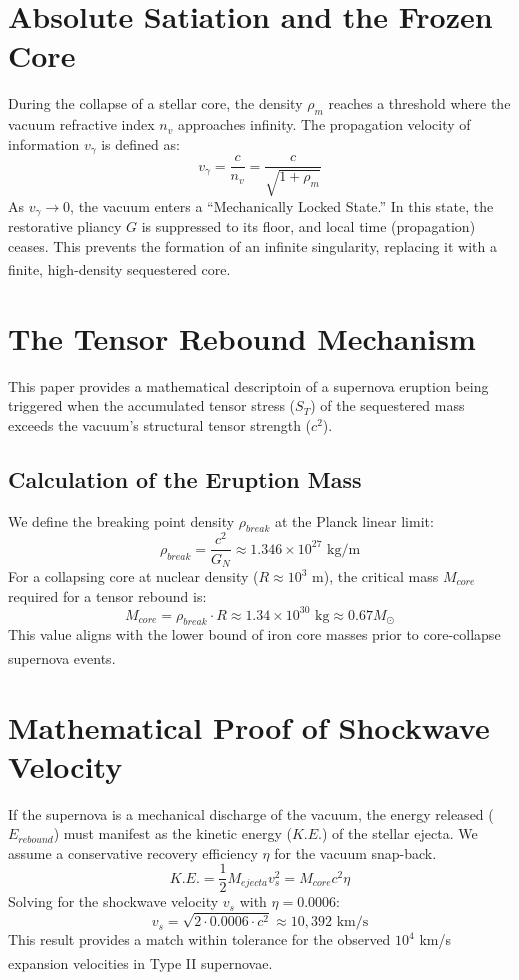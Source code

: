 \documentclass[11pt,a4paper,oneside]{article}
\newcommand{\citeS}[1]{\textsuperscript{\cite{#1}}}
\begin{document}
\section{Absolute Satiation and the Frozen Core}
During the collapse of a stellar core, the density $\rho_m$ reaches a threshold where the vacuum refractive index $n_v$ approaches infinity. The propagation velocity of information $v_{\gamma}$ is defined as:
\begin{equation}
v_{\gamma} = \frac{c}{n_v} = \frac{c}{\sqrt{1 + \rho_m}}
\end{equation}
As $v_{\gamma} \to 0$, the vacuum enters a ``Mechanically Locked State.'' In this state, the restorative pliancy $G$ is suppressed to its floor, and local time (propagation) ceases. This prevents the formation of an infinite singularity, replacing it with a finite, high-density sequestered core\citeS{Penrose1965}.

\section{The Tensor Rebound Mechanism}
This paper provides a mathematical descriptoin of a supernova eruption being triggered when the accumulated tensor stress ($S_T$) of the sequestered mass exceeds the vacuum's structural tensor strength ($c^2$).

\subsection{Calculation of the Eruption Mass}
We define the breaking point density $\rho_{break}$ at the Planck linear limit:
\begin{equation}
\rho_{break} = \frac{c^2}{G_N} \approx 1.346 \times 10^{27} \text{ kg/m}
\end{equation}
For a collapsing core at nuclear density ($R \approx 10^3$ m), the critical mass $M_{core}$ required for a tensor rebound is:
\begin{equation}
M_{core} = \rho_{break} \cdot R \approx 1.34 \times 10^{30} \text{ kg} \approx 0.67 M_{\odot}
\end{equation}
This value aligns with the lower bound of iron core masses prior to core-collapse supernova events\citeS{Woosley2002}.

\section{Mathematical Proof of Shockwave Velocity}
If the supernova is a mechanical discharge of the vacuum, the energy released ($E_{rebound}$) must manifest as the kinetic energy ($K.E.$) of the stellar ejecta. We assume a conservative recovery efficiency $\eta$ for the vacuum snap-back.
\begin{equation}
K.E. = \frac{1}{2} M_{ejecta} v_s^2 = M_{core} c^2 \eta
\end{equation}
Solving for the shockwave velocity $v_s$ with $\eta = 0.0006$:
\begin{equation}
v_s = \sqrt{2 \cdot 0.0006 \cdot c^2} \approx 10,392 \text{ km/s}
\end{equation}
This result provides a match within tolerance for the observed $10^4$ km/s expansion velocities in Type II supernovae\citeS{Filippenko1997}.
\end{document}
